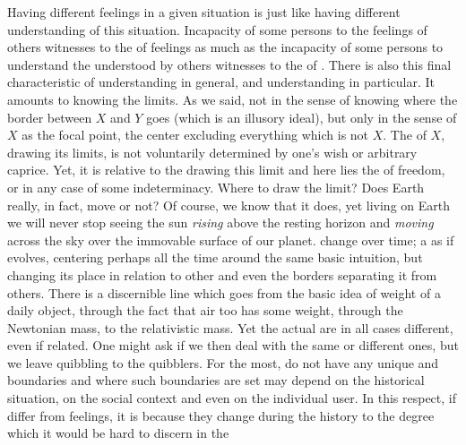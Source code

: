 Having different feelings in a given situation is just like having different
understanding of this situation. Incapacity of some persons to  the
feelings of others witnesses to the  of feelings as much as
the incapacity of some persons to understand the  understood by
others witnesses to the  of .  There is also this
final characteristic of understanding in general, and 
understanding in particular. It amounts to knowing the limits. As we said, not
in the sense of knowing  where the border between $X$ and $Y$ goes
(which is an illusory ideal), but only in the sense of  $X$ as
the focal point, the center excluding everything which is not $X$. The
 of $X$, drawing its limits, is not voluntarily determined by
one's wish or arbitrary caprice. Yet, it is relative to the 
drawing this limit and here lies the  of freedom, or in any case of
some indeterminacy. Where to draw the limit? Does Earth really, in fact, move or
not? Of course, we know that it does, yet living on Earth we will never stop
seeing the sun {\em rising} above the resting horizon and {\em moving} across
the sky over the 
immovable surface of our planet.   change over time; a 
as if evolves, centering perhaps all the time around the same basic intuition,
but changing its place in relation to other  and even the borders
separating it from others. There is a discernible line which goes from the basic
idea of weight of a daily object, through the fact that air too has some weight,
through the Newtonian mass, to the relativistic mass. Yet the actual
 are in all cases different, even if  related. One
might ask if we then deal with the same  or different ones, but we
leave quibbling to the quibblers. For the most,  do not have any
unique and  boundaries and where such boundaries are set may depend
on the historical situation, on the social context and even on the individual
user.   In
this respect, if  differ from feelings, it is because they change
during the history to the degree which it would be hard to discern in the
